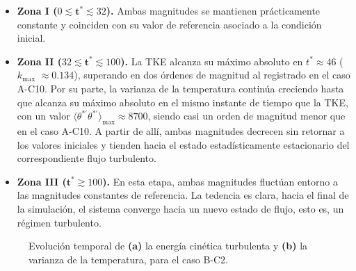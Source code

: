 \begin{itemize}

  \item \textbf{Zona I ($0 \lesssim \mathbf{t^*} \lesssim 32$).} Ambas magnitudes se mantienen prácticamente constante y coinciden con su valor de referencia asociado a la condición inicial.

  \item \textbf{Zona II ($32 \lesssim \mathbf{t^*} \lesssim 100$).} La TKE alcanza su máximo absoluto en $t^* \approx 46$ ($k_{\text{max}}$ $\approx 0\text{.}134$), superando en dos órdenes de magnitud al registrado en el caso A-C10. Por su parte, la varianza de la temperatura continúa creciendo hasta que alcanza su máximo absoluto en el mismo instante de tiempo que la TKE, con un valor $\langle \theta^{*\prime} \theta^{*\prime}\rangle_{\text{max}} \approx 8700$, siendo casi un orden de magnitud menor que en el caso A-C10. A partir de allí, ambas magnitudes decrecen sin retornar a los valores iniciales y tienden hacia el estado estadísticamente estacionario del correspondiente flujo turbulento.

  \item \textbf{Zona III ($\mathbf{t^*} \gtrsim 100$).} En esta etapa, ambas magnitudes fluctúan entorno a las magnitudes constantes de referencia. La tedencia es clara, hacia el final de la simulación, el sistema converge hacia un nuevo estado de flujo, esto es, un régimen turbulento. 

\end{itemize}


\begin{figure}[H]
  \centering  
    
  \caption{Evolución temporal de \textbf{(a)} la energía cinética turbulenta y \textbf{(b)} la varianza de la temperatura, para el caso B-C2.}
  \label{fig:bc2-2}
\end{figure}


